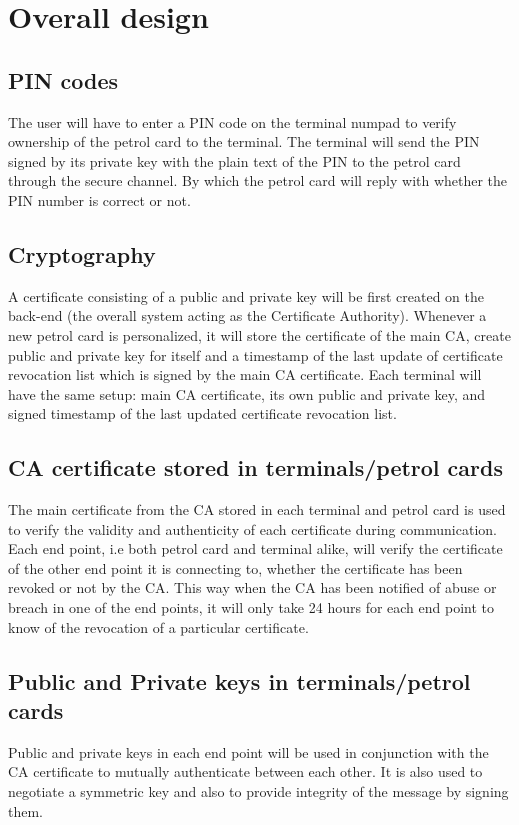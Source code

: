 \section{Overall design}
\subsection{PIN codes}
The user will have to enter a PIN code on the terminal numpad to verify ownership of the petrol card to the terminal. The terminal will send the PIN signed by its private key with the plain text of the PIN to the petrol card through the secure channel. By which the petrol card will reply with whether the PIN number is correct or not.

\subsection{Cryptography}
A certificate consisting of a public and private key will be first created on the back-end (the overall system acting as the Certificate Authority). Whenever a new petrol card is personalized, it will store the certificate of the main CA, create public and private key for itself and a timestamp of the last update of certificate revocation list which is signed by the main CA certificate. Each terminal will have the same setup: main CA certificate, its own public and private key, and signed timestamp of the last updated certificate revocation list.

\subsection{CA certificate stored in terminals/petrol cards}
The main certificate from the CA stored in each terminal and petrol card is used to verify the validity and authenticity of each certificate during communication. Each end point, i.e both petrol card and terminal alike, will verify the certificate of the other end point it is connecting to, whether the certificate has been revoked or not by the CA. This way when the CA has been notified of abuse or breach in one of the end points, it will only take 24 hours for each end point to know of the revocation of a particular certificate.

\subsection{Public and Private keys in terminals/petrol cards}
Public and private keys in each end point will be used in conjunction with the CA certificate to mutually authenticate between each other. It is also used to negotiate a symmetric key and also to provide integrity of the message by signing them.

